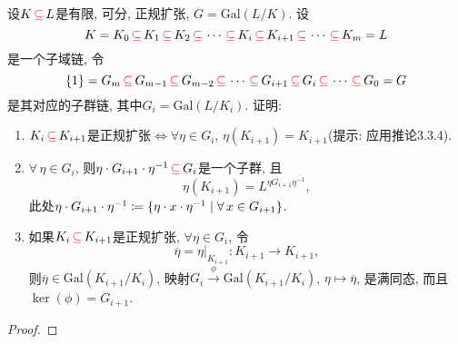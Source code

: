 \begin{problem}
    设$K \,\textcolor{red}{\subseteq}\, L$是有限, 可分, 正规扩张, $G = \mathrm{Gal}(L/K)$. 设
    \[
        K = K_0 \,\textcolor{red}{\subseteq}\, K_1 \,\textcolor{red}{\subseteq}\, K_2 \,\textcolor{red}{\subseteq}\, \cdots \,\textcolor{red}{\subseteq}\, K_i \,\textcolor{red}{\subseteq}\, K_{i + 1} \,\textcolor{red}{\subseteq}\, \cdots \,\textcolor{red}{\subseteq}\, K_m = L
    \]
    是一个子域链, 令
    \[
        \{1\} = G_m \,\textcolor{red}{\subseteq}\, G_{m - 1} \,\textcolor{red}{\subseteq}\, G_{m - 2} \,\textcolor{red}{\subseteq}\, \cdots \,\textcolor{red}{\subseteq}\, G_{i + 1} \,\textcolor{red}{\subseteq}\, G_i \,\textcolor{red}{\subseteq}\, \cdots \,\textcolor{red}{\subseteq}\, G_0 = G
    \]
    是其对应的子群链, 其中$G_i = \mathrm{Gal}(L/K_i)$. 证明: 
    \begin{enumerate}[(1)]
        \item $K_i \,\textcolor{red}{\subseteq}\, K_{i + 1}$是正规扩张$\Leftrightarrow \forall \eta \in G_i,\, \eta(K_{i + 1}) = K_{i + 1}$(提示: 应用推论3.3.4).
        \item $\forall\, \eta \in G_i$, 则$\eta \cdot G_{i + 1} \cdot \eta^{-1} \,\textcolor{red}{\subseteq}\, G_i$是一个子群, 且
        \[
            \eta(K_{i + 1}) = L^{\eta G_{i + 1}\eta^{-1}},
        \]
        此处$\eta \cdot G_{i + 1} \cdot \eta ^{- 1} \mathrel{\coloneqq} \{\eta \cdot x \cdot \eta^{-1} \mid \forall\, x \in G_{i + 1}\}$.
        \item 如果$K_i \,\textcolor{red}{\subseteq}\, K_{i + 1}$是正规扩张, $\forall \eta \in G_i$, 令
        \[
            \overline{\eta} = \eta|_{K_{i + 1}}:K_{i + 1} \to K_{i + 1},
        \]
        则$\overline{\eta} \in \mathrm{Gal}(K_{i + 1}/K_i)$, 映射$G_i \overset{\phi}\to \mathrm{Gal}(K_{i + 1}/K_i)$, $\eta \mapsto \overline{\eta}$, 是满同态, 而且$\ker(\phi) = G_{i + 1}$.
    \end{enumerate}
\end{problem}

\begin{proof}
    
\end{proof}